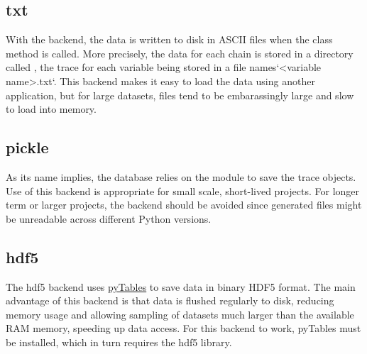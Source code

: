 \hypertarget{txt}{}
\subsection*{txt}

With the  backend, the data is written to disk in ASCII files when the class  method is called. More precisely, the data for each chain is stored in a directory called , the trace for each variable being stored in a file names`{\textless}variable name{\textgreater}.txt`. This backend makes it easy to load the data using another application, but for large datasets, files tend to be embarassingly large and slow to load into memory.



\hypertarget{pickle}{}
\subsection*{pickle}

As its name implies, the  database relies on the  module to save the trace objects. Use of this backend is appropriate for small scale, short-lived projects. For longer term or larger projects, the  backend should be avoided since generated files might be unreadable across different Python versions.



\hypertarget{hdf5}{}
\subsection*{hdf5}

The hdf5 backend uses \href{http://www.pytables.org/moin}{pyTables} to save data in binary HDF5 format. The main advantage of this backend is that data is flushed regularly to disk, reducing memory usage and allowing sampling of datasets much larger than the available RAM memory, speeding up data access. For this backend to work, pyTables must be installed, which in turn requires the hdf5 library.



\hypertarget{sqlite}{}
